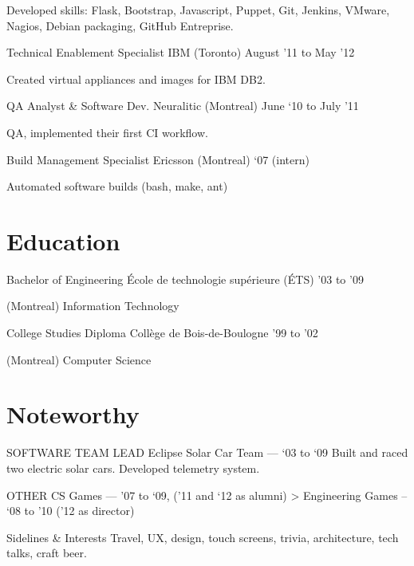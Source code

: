 \documentclass[]{cvpn}
\begin{document}
\begin{eventlist}
Developed skills: Flask, Bootstrap, Javascript,
Puppet, Git, Jenkins, VMware, Nagios, Debian packaging,
GitHub Entreprise.

\item{Technical Enablement Specialist}
     {IBM (Toronto)}
     {August '11 to May '12}

Created virtual appliances and images for IBM DB2.

\item{QA Analyst \& Software Dev.}
     {Neuralitic (Montreal)}
     {June ‘10 to July ’11}

QA, implemented their first CI workflow.

\item{Build Management Specialist}
     {Ericsson (Montreal)}
     {‘07 (intern)}

Automated software builds (bash, make, ant)

\end{eventlist}

\section{Education}
\begin{eventlist}

\item{Bachelor of Engineering}
     {École de technologie supérieure (ÉTS)}
     {'03 to '09}

(Montreal) Information Technology

\item{College Studies Diploma}
     {Collège de Bois-de-Boulogne}
     {'99 to '02}

(Montreal) Computer Science

\end{eventlist}

\section{Noteworthy}
SOFTWARE TEAM LEAD
Eclipse Solar Car Team --- ‘03 to ‘09
Built and raced two electric solar cars. Developed telemetry system.

OTHER
CS Games --- ’07 to ‘09, (’11 and ‘12 as alumni) > Engineering Games – ‘08 to ’10 (’12 as director)

Sidelines \& Interests
Travel, UX, design, touch screens, trivia, architecture, tech talks, craft beer.
\end{document}
